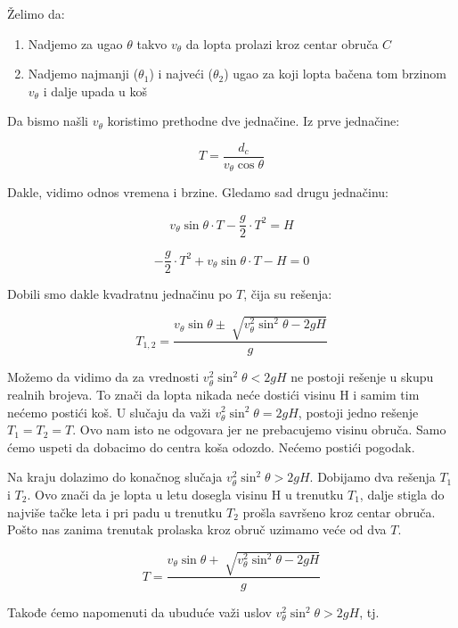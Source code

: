\documentclass[a4paper, 12pt]{article}
\begin{document}

Želimo da:

\begin{enumerate}
\item Nadjemo za ugao $\theta$ takvo $v_{\theta}$ da lopta prolazi kroz centar obruča $C$
\item Nadjemo najmanji ($\theta_1$) i najveći ($\theta_2$) ugao za koji lopta bačena tom brzinom $v_{\theta}$ i dalje upada u koš
\end{enumerate}

Da bismo našli $v_{\theta}$ koristimo prethodne dve jednačine. Iz prve jednačine:

\begin{equation}
T = \dfrac{d_c}{v_\theta \cos \theta}
\end{equation}

Dakle, vidimo odnos vremena i brzine. Gledamo sad drugu jednačinu:

\[v_{\theta} \sin \theta \cdot T - \dfrac{g}{2} \cdot T^2 = H\]

\[- \dfrac{g}{2} \cdot T^2 + v_{\theta} \sin \theta \cdot T - H = 0\]

Dobili smo dakle kvadratnu jednačinu po $T$, čija su rešenja:

\[T_{1,2} = \dfrac{v_{\theta} \sin \theta \pm \sqrt[]{v_{\theta}^2 \sin^2 \theta - 2 g H}}{g}\]

Možemo da vidimo da za vrednosti ${v_{\theta}^2 \sin^2 \theta < 2 g H}$ ne postoji rešenje u skupu realnih brojeva. To znači da lopta nikada neće dostići visinu H i samim tim nećemo postići koš.
U slučaju da važi ${v_{\theta}^2 \sin^2 \theta = 2 g H}$, postoji jedno rešenje $T_1 = T_2 = T$. Ovo nam isto ne odgovara jer ne prebacujemo visinu obruča. Samo ćemo uspeti da dobacimo do centra koša odozdo. Nećemo postići pogodak.

Na kraju dolazimo do konačnog slučaja ${v_{\theta}^2 \sin^2 \theta > 2 g H}$. Dobijamo dva rešenja $T_1$ i $T_2$. Ovo znači da je lopta u letu dosegla visinu H u trenutku $T_1$, dalje stigla do najviše tačke leta i pri padu u trenutku $T_2$ prošla savršeno kroz centar obruča. Pošto nas zanima trenutak prolaska kroz obruč uzimamo veće od dva $T$.

\begin{equation}
T = \dfrac{v_{\theta} \sin \theta + \sqrt[]{v_{\theta}^2 \sin^2 \theta - 2 g H}}{g}
\end{equation}

Takođe ćemo napomenuti da ubuduće važi uslov ${v_{\theta}^2 \sin^2 \theta > 2 g H}$, tj.
\end{document}
